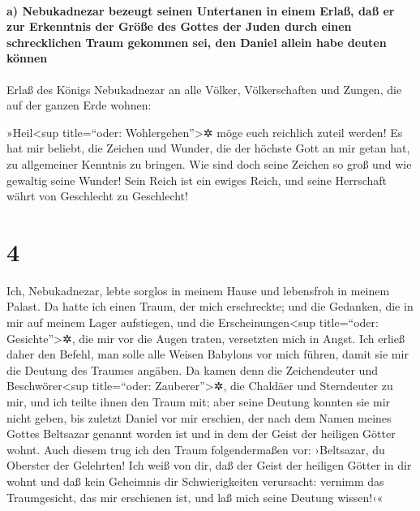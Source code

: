 \hypertarget{a-nebukadnezar-bezeugt-seinen-untertanen-in-einem-erlauxdf-dauxdf-er-zur-erkenntnis-der-gruxf6uxdfe-des-gottes-der-juden-durch-einen-schrecklichen-traum-gekommen-sei-den-daniel-allein-habe-deuten-kuxf6nnen}{%
\paragraph{a) Nebukadnezar bezeugt seinen Untertanen in einem Erlaß, daß
er zur Erkenntnis der Größe des Gottes der Juden durch einen
schrecklichen Traum gekommen sei, den Daniel allein habe deuten
können}\label{a-nebukadnezar-bezeugt-seinen-untertanen-in-einem-erlauxdf-dauxdf-er-zur-erkenntnis-der-gruxf6uxdfe-des-gottes-der-juden-durch-einen-schrecklichen-traum-gekommen-sei-den-daniel-allein-habe-deuten-kuxf6nnen}}

Erlaß des Königs Nebukadnezar an alle Völker,
Völkerschaften und Zungen, die auf der ganzen Erde wohnen:

»Heil\textless sup title=``oder: Wohlergehen''\textgreater✲ möge euch
reichlich zuteil werden! Es hat mir beliebt, die Zeichen
und Wunder, die der höchste Gott an mir getan hat, zu allgemeiner
Kenntnis zu bringen. Wie sind doch seine Zeichen so groß
und wie gewaltig seine Wunder! Sein Reich ist ein ewiges Reich, und
seine Herrschaft währt von Geschlecht zu Geschlecht!

\hypertarget{section-3}{%
\section{4}\label{section-3}}

Ich, Nebukadnezar, lebte sorglos in meinem Hause und
lebensfroh in meinem Palast. Da hatte ich einen Traum, der
mich erschreckte; und die Gedanken, die in mir auf meinem Lager
aufstiegen, und die Erscheinungen\textless sup title=``oder:
Gesichte''\textgreater✲, die mir vor die Augen traten, versetzten mich
in Angst. Ich erließ daher den Befehl, man solle alle
Weisen Babylons vor mich führen, damit sie mir die Deutung des Traumes
angäben. Da kamen denn die Zeichendeuter und
Beschwörer\textless sup title=``oder: Zauberer''\textgreater✲, die
Chaldäer und Sterndeuter zu mir, und ich teilte ihnen den Traum mit;
aber seine Deutung konnten sie mir nicht geben, bis
zuletzt Daniel vor mir erschien, der nach dem Namen meines Gottes
Beltsazar genannt worden ist und in dem der Geist der heiligen Götter
wohnt. Auch diesem trug ich den Traum folgendermaßen vor:
›Beltsazar, du Oberster der Gelehrten! Ich weiß von dir,
daß der Geist der heiligen Götter in dir wohnt und daß kein Geheimnis
dir Schwierigkeiten verursacht: vernimm das Traumgesicht, das mir
erschienen ist, und laß mich seine Deutung wissen!‹«

